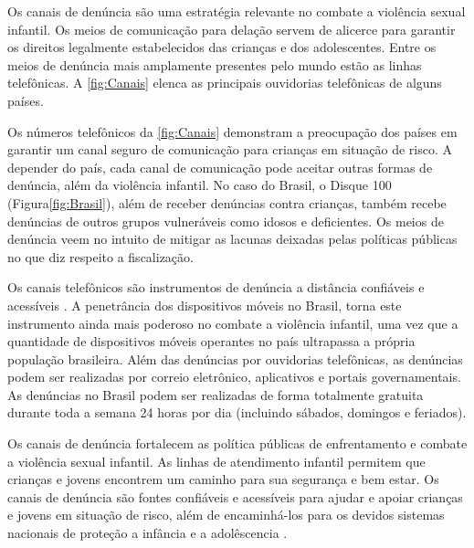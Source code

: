 
Os canais de denúncia são uma estratégia relevante no combate a violência sexual infantil. Os meios de comunicação para delação servem de alicerce para garantir os direitos legalmente estabelecidos das crianças e dos adolescentes. Entre os meios de denúncia mais amplamente presentes pelo mundo estão as linhas telefônicas. A \autoref{fig:Canais} elenca as principais ouvidorias telefônicas de alguns países.


Os números telefônicos da \autoref{fig:Canais} demonstram a preocupação dos países em garantir um canal seguro de comunicação para crianças em situação de risco. A depender do país, cada canal de comunicação pode aceitar outras formas de denúncia, além da violência infantil. No caso do Brasil, o Disque 100 (Figura\autoref{fig:Brasil}), além de receber denúncias contra crianças, também recebe denúncias de outros grupos vulneráveis como idosos e deficientes. Os meios de denúncia veem no intuito de mitigar as lacunas deixadas pelas políticas públicas no que diz respeito a fiscalização.

Os canais telefônicos são instrumentos de denúncia a distância confiáveis e acessíveis \cite{linhas2017}. A penetrância dos dispositivos móveis no Brasil, torna este instrumento ainda mais poderoso no combate a violência infantil, uma vez que a quantidade de dispositivos móveis operantes no país ultrapassa a própria população brasileira. Além das denúncias por ouvidorias telefônicas, as denúncias podem ser realizadas por correio eletrônico, aplicativos e portais governamentais. As denúncias no Brasil podem ser realizadas de forma totalmente gratuita durante toda a semana 24 horas por dia (incluindo sábados, domingos e feriados).

Os canais de denúncia fortalecem as política públicas de enfrentamento e combate a violência sexual infantil. As linhas de atendimento infantil permitem que crianças e jovens encontrem um caminho para sua segurança e bem estar. Os canais de denúncia são fontes confiáveis e acessíveis para ajudar e apoiar crianças e jovens em situação de risco, além de encaminhá-los para os devidos sistemas nacionais de proteção a infância e a adolêscencia \cite{linhas2017}.



